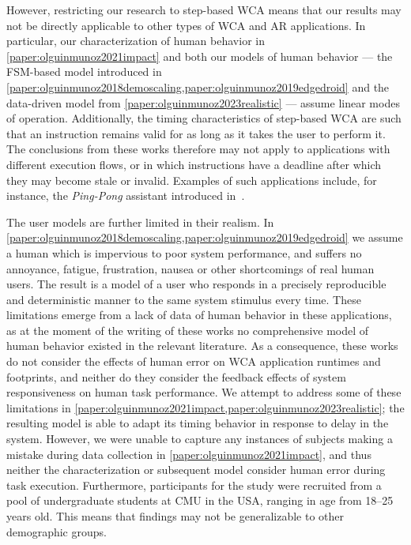 However, restricting our research to step-based \gls{WCA} means that our results may not be directly applicable to other types of \gls{WCA} and \gls{AR} applications.
In particular, our characterization of human behavior in \cref{paper:olguinmunoz2021impact} and both our models of human behavior --- the \gls{FSM}-based model introduced in \cref{paper:olguinmunoz2018demoscaling,paper:olguinmunoz2019edgedroid} and the data-driven model from \cref{paper:olguinmunoz2023realistic} --- assume linear modes of operation.
Additionally, the timing characteristics of step-based \gls{WCA} are such that an instruction remains valid for as long as it takes the user to perform it.
The conclusions from these works therefore may not apply to applications with different execution flows, or in which instructions have a deadline after which they may become stale or invalid.
Examples of such applications include, for instance, the \emph{Ping-Pong} assistant introduced in~\cite{chen2015early}.

The user models are further limited in their realism.
In \cref{paper:olguinmunoz2018demoscaling,paper:olguinmunoz2019edgedroid} we assume a human which is impervious to poor system performance, and suffers no annoyance, fatigue, frustration, nausea or other shortcomings of real human users.
The result is a model of a user who responds in a precisely reproducible and deterministic manner to the same system stimulus every time.
These limitations emerge from a lack of data of human behavior in these applications, as at the moment of the writing of these works no comprehensive model of human behavior existed in the relevant literature.
As a consequence, these works do not consider the effects of human error on \gls{WCA} application runtimes and footprints, and neither do they consider the feedback effects of system responsiveness on human task performance.
We attempt to address some of these limitations in \cref{paper:olguinmunoz2021impact,paper:olguinmunoz2023realistic};
the resulting model is able to adapt its timing behavior in response to delay in the system.
However, we were unable to capture any instances of subjects making a mistake during data collection in \cref{paper:olguinmunoz2021impact}, and thus neither the characterization or subsequent model consider human error during task execution.
Furthermore, participants for the study were recruited from a pool of undergraduate students at \gls{CMU} in the \gls{USA}, ranging in age from \numrange{18}{25} years old.
This means that findings may not be generalizable to other demographic groups.

